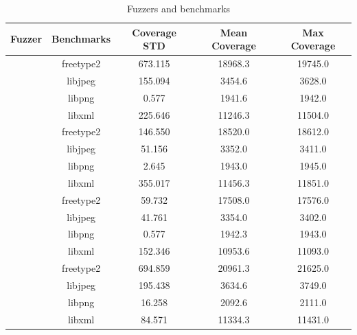 \begin{table}[!t]
    \begin{tabular}{|l|c|c|c|c|} 
        \hline
        \textbf{Fuzzer}         & \textbf{Benchmarks} & \textbf{Coverage STD} & \textbf{Mean Coverage} & \textbf{Max Coverage} \\
        \hline
        \rowcolor{gray!20}      & freetype2 & 673.115 & 18968.3 & 19745.0 \\ \cline{2-5}
                                & libjpeg   & 155.094 &  3454.6 &  3628.0 \\ \cline{2-5}
                                \rowcolor{gray!20} & libpng    &  	0.577 &  1941.6 &  1942.0 \\ \cline{2-5}
                                & libxml    & 225.646 & 11246.3 & 11504.0 \\ \cline{2-5}
        \hline
        \rowcolor{gray!20}{4} \multirow{4}{*}{AFL}    & freetype2 & 146.550 & 18520.0 & 18612.0 \\ \cline{2-5}
                                & libjpeg   &  51.156 &  3352.0 &  3411.0 \\ \cline{2-5}
                                & libpng    &   2.645 &  1943.0 &  1945.0 \\ \cline{2-5}
                                & libxml    & 355.017 & 11456.3 & 11851.0 \\ \cline{2-5}
        \hline
        \rowcolor{gray!20} \multirow{4}{*}{AFLFast}& freetype2 &  59.732 & 17508.0 & 17576.0 \\ \cline{2-5}
                                & libjpeg   &  41.761 &  3354.0 &  3402.0 \\ \cline{2-5}
                                & libpng    &   0.577 &  1942.3 &  1943.0 \\ \cline{2-5}
                                & libxml    & 152.346 & 10953.6 & 11093.0 \\ \cline{2-5}
        \hline
        \rowcolor{gray!20} \multirow{4}{*}{AFL++}  & freetype2 & 694.859 & 20961.3 & 21625.0 \\ \cline{2-5}
                                & libjpeg   & 195.438 &  3634.6 &  3749.0 \\ \cline{2-5}
                                & libpng    &  16.258 &  2092.6 &  2111.0 \\ \cline{2-5}
                                & libxml    & 84.571  & 11334.3 & 11431.0 \\ \cline{2-5}
        \hline
    \end{tabular}
    \caption{Fuzzers and benchmarks}
    \label{table:all}
\end{table}




